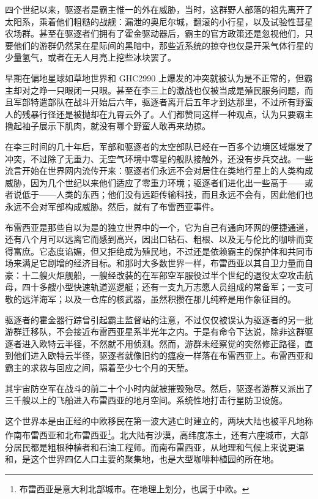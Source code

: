 \documentclass[AutoFakeBold=true]{book}
\begin{document}
四个世纪以来，驱逐者是霸主惟一的外在威胁，当时，这群野人部落的祖先离开了太阳系，乘着他们粗糙的战舰：漏泄的奥尼尔城，翻滚的小行星，以及试验性彗星农场群。甚至在驱逐者们拥有了霍金驱动器后，霸主的官方政策还是忽视他们，只要他们的游群仍然呆在星际间的黑暗中，那些近系统的掠夺也仅是开采气体行星的少量氢气，或者在无人月亮上挖些冰块罢了。

早期在偏地星球如草地世界和 GHC2990 上爆发的冲突就被认为是不正常的，但霸主却对之睁一只眼闭一只眼。甚至在李三上的激战也仅被当成是殖民服务问题，而且军部特遣部队在战斗开始后六年，驱逐者离开后五年才到达那里，不过所有野蛮人的残暴行径还是被抛却在九霄云外了。人们都赞同这样一种观点，认为只要霸主撸起袖子展示下肌肉，就没有哪个野蛮人敢再来劫掠。

在李三时间的几十年后，军部和驱逐者的太空部队已经在一百多个边境区域爆发了冲突，不过除了无重力、无空气环境中零星的舰队接触外，还没有步兵交战。一些流言开始在世界网内流传开来：驱逐者们永远不会对居住在类地行星上的人类构成威胁，因为几个世纪以来他们适应了零重力环境；驱逐者们进化出一些高于——或者说低于——人类的东西；他们没有远距传输科技，而且永远不会有，因此他们也永远不会对军部构成威胁。然后，就有了布雷西亚事件。

布雷西亚是那些自以为是的独立世界中的一个，它为自己有通向环网的便捷通道，还有八个月可以远离它而感到高兴，因出口钻石、粗根、以及无与伦比的咖啡而变得富庶。它态度谄媚，但又拒绝成为殖民地，不过还是依赖霸主的保护体和共同市场来满足它剧增的经济目标。和那时大多数世界一样，布雷西亚以其自卫力量而自豪：十二艘火炬舰船，一艘经改装的在军部空军服役过半个世纪的退役太空攻击航母，四十多艘小型快速轨道巡逻艇；还有一支九万志愿人员组成的常备军；一支可敬的远洋海军；以及一仓库的核武器，虽然积攒在那儿纯粹是用作象征目的。

驱逐者的霍金器行踪曾引起霸主监督站的注意，不过仅仅被误认为驱逐者的另一批游群迁移队，不会接近布雷西亚星系半光年之内。于是有命令下达说，除非这群驱逐者进入欧特云半径，不然就不用侦测。然而，游群未经察觉的突然修正路径，直到他们进入欧特云半径，驱逐者就像旧约的瘟疫一样落在布雷西亚上。布雷西亚和霸主的求救与回应之间，隔着至少七个月的天堑。

其宇宙防空军在战斗的前二十个小时内就被摧毁殆尽。然后，驱逐者游群又派出了三千艘以上的飞船进入布雷西亚的地月空间。系统性地打击行星防卫设施。

这个世界本是由正经的中欧移民在第一波大逃亡时建立的，两块大陆也被平凡地称作南布雷西亚和北布雷西亚\footnote{布雷西亚是意大利北部城市。在地理上划分，也属于中欧。}。北大陆有沙漠，高纬度冻土，还有六座城市，大部分居民都是粗根种植者和石油工程师。而南布雷西亚，从地理和气候上来说更温和，是这个世界四亿人口主要的聚集地，也是大型咖啡种植园的所在地。
\end{document}
